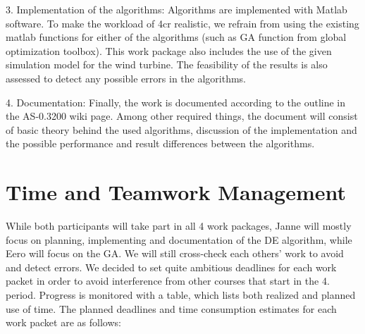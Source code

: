 \documentclass[twoside]{article}
\begin{document}
\begin{multicols}{2}
3. Implementation of the algorithms:
Algorithms are implemented with Matlab software. To make the workload of 4cr realistic, we refrain from using the existing matlab functions for either of the algorithms (such as GA function from global optimization toolbox). This work package also includes the use of the given simulation model for the wind turbine. The feasibility of the results is also assessed to detect any possible errors in the algorithms.

4. Documentation:
Finally, the work is documented according to the outline in the AS-0.3200 wiki page. Among other required things, the document will consist of basic theory behind the used algorithms, discussion of the implementation and the possible performance and result differences between the algorithms.




\section{Time and Teamwork Management}

While both participants will take part in all 4 work packages, Janne will mostly focus on planning, implementing and documentation of the DE algorithm, while Eero will focus on the GA. We will still cross-check each others' work to avoid and detect errors. We decided to set quite ambitious deadlines for each work packet in order to avoid interference from other courses that start in the 4. period. Progress is monitored with a table, which lists both realized and planned use of time. The planned deadlines and time consumption estimates for each work packet are as follows:


\end{multicols}
\end{document}
